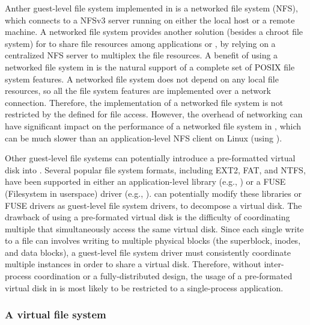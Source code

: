 Anther guest-level file system implemented in \thelibos{}
is a networked file system (NFS), which connects to a NFSv3 server running on either the local host or a remote machine.
A networked file system provides another solution (besides a chroot file system)
for \thelibos{} to share file resources among applications or \picoprocs{}, by relying on a centralized NFS server to multiplex the file resources. 
A benefit of using a networked file system in \thelibos{}
is the natural support of a complete set of POSIX file system features.
A networked file system does not depend on any local file resources, so all the file system features are implemented over a network connection.
Therefore, the implementation of a networked file system is not restricted by
the \hostapis{} defined for file access.
However, 
the overhead of networking \hostapis{}
can have significant impact on
the performance of a networked file system in \thelibos{},
which can be
much slower than an application-level NFS client on Linux (using ).





Other guest-level file systems can potentially introduce a pre-formatted virtual disk into \thelibos{}.
Several popular file system formats,
including EXT2, FAT, and NTFS, have been supported in either an application-level library (e.g., ) or a FUSE (Filesystem in userspace) driver (e.g., ).
\thelibos{} can potentially modify
these libraries or FUSE drivers as guest-level file system drivers,
to decompose a virtual disk.
The drawback of using a pre-formated virtual disk
is the difficulty of coordinating multiple \picoprocs{} that simultaneously access the same virtual disk.
Since each single write to a file can involves writing to multiple physical blocks (the superblock, inodes, and data blocks),
a guest-level file system driver must consistently coordinate multiple \thelibos{} instances in order to share a virtual disk.
Therefore, without inter-process coordination or a fully-distributed design, the usage of a pre-formated virtual disk in \thelibos{}
is most likely to be restricted to a single-process application.




\subsubsection{A virtual file system}
\label{sec:libos:vfs}


